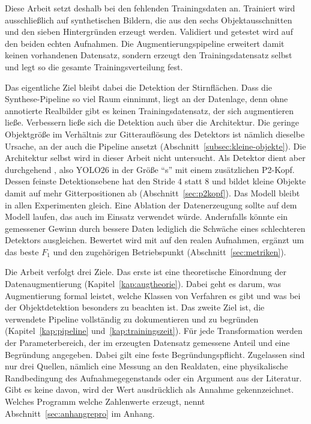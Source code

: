 Diese Arbeit setzt deshalb bei den fehlenden Trainingsdaten an. Trainiert wird
ausschließlich auf synthetischen Bildern, die aus den sechs Objektausschnitten
und den sieben Hintergründen erzeugt werden. Validiert und getestet wird auf
den beiden echten Aufnahmen. Die Augmentierungspipeline erweitert damit keinen
vorhandenen Datensatz, sondern erzeugt den Trainingsdatensatz selbst und legt
so die gesamte Trainingsverteilung fest.

Das eigentliche Ziel bleibt dabei die Detektion der Stirnflächen. Dass die
Synthese-Pipeline so viel Raum einnimmt, liegt an der Datenlage, denn ohne
annotierte Realbilder gibt es keinen Trainingsdatensatz, der sich augmentieren
ließe. Verbessern ließe sich die Detektion auch über die Architektur. Die
geringe Objektgröße im Verhältnis zur Gitterauflösung des Detektors ist nämlich
dieselbe Ursache, an der auch die Pipeline ansetzt
(Abschnitt~\ref{subsec:kleine-objekte}). Die Architektur selbst wird in dieser
Arbeit nicht untersucht. Als Detektor dient aber durchgehend
, also YOLO26 in der Größe \enquote{s} mit einem zusätzlichen
P2-Kopf. Dessen feinste Detektionsebene hat den Stride 4 statt 8 und
bildet kleine Objekte damit auf mehr Gitterpositionen ab
(Abschnitt~\ref{sec:p2kopf}). Das Modell bleibt in allen Experimenten gleich.
Eine Ablation der Datenerzeugung sollte auf dem Modell laufen, das auch im
Einsatz verwendet würde. Andernfalls könnte ein gemessener Gewinn durch
bessere Daten lediglich die Schwäche eines schlechteren Detektors ausgleichen.
Bewertet
wird mit \mAPfifty{} auf den realen Aufnahmen, ergänzt um das beste $F_1$ und
den zugehörigen Betriebspunkt (Abschnitt~\ref{sec:metriken}).

Die Arbeit verfolgt drei Ziele. Das erste ist eine theoretische Einordnung der
Datenaugmentierung (Kapitel~\ref{kap:augtheorie}). Dabei geht es darum, was
Augmentierung formal leistet, welche Klassen von Verfahren es gibt und was bei
der Objektdetektion besonders zu beachten ist. Das zweite Ziel ist, die
verwendete Pipeline vollständig zu dokumentieren und zu begründen
(Kapitel~\ref{kap:pipeline} und~\ref{kap:trainingszeit}). Für jede
Transformation werden der Parameterbereich, der im erzeugten Datensatz
gemessene Anteil und eine Begründung angegeben. Dabei gilt eine feste
Begründungspflicht. Zugelassen sind nur drei Quellen, nämlich eine Messung an
den Realdaten, eine physikalische Randbedingung des Aufnahmegegenstands oder ein
Argument aus der Literatur. Gibt es keine davon, wird der Wert ausdrücklich als
Annahme gekennzeichnet. Welches Programm welche Zahlenwerte erzeugt, nennt
Abschnitt~\ref{sec:anhangrepro} im Anhang.

